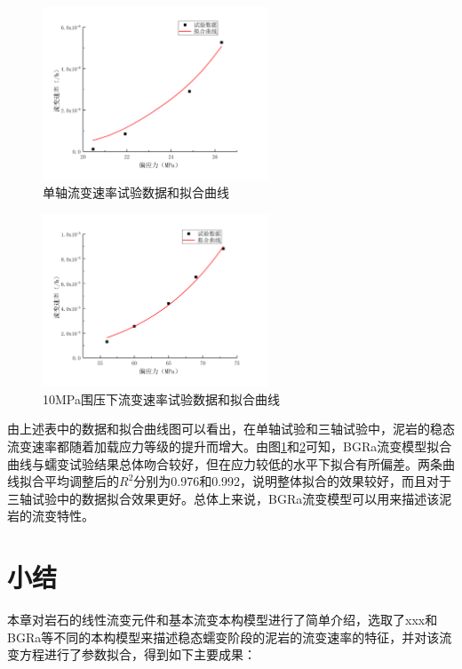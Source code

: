 \begin{figure}[ht!]
    \centering
            \centering
            \includegraphics[width=0.6\textwidth]{img/chap3/Uniaxial curve fitting.png}
    \caption{单轴流变速率试验数据和拟合曲线}
    \label{fig:3-8}
\end{figure}

\begin{figure}[ht!]
    \centering
            \centering
            \includegraphics[width=0.6\textwidth]{img/chap3/Triaxial curve fitting.png}
    \caption{10MPa围压下流变速率试验数据和拟合曲线}
    \label{fig:3-9}
\end{figure}

由上述表中的数据和拟合曲线图可以看出，在单轴试验和三轴试验中，泥岩的稳态流变速率都随着加载应力等级的提升而增大。由图\ref{fig:3-8}和\ref{fig:3-9}可知，BGRa流变模型拟合曲线与蠕变试验结果总体吻合较好，但在应力较低的水平下拟合有所偏差。两条曲线拟合平均调整后的$R^2$分别为0.976和0.992，说明整体拟合的效果较好，而且对于三轴试验中的数据拟合效果更好。总体上来说，BGRa流变模型可以用来描述该泥岩的流变特性。

\section{小结}
本章对岩石的线性流变元件和基本流变本构模型进行了简单介绍，选取了xxx和BGRa等不同的本构模型来描述稳态蠕变阶段的泥岩的流变速率的特征，并对该流变方程进行了参数拟合，得到如下主要成果：

